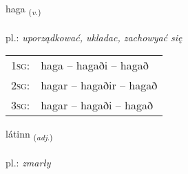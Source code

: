 \documentclass[frontgrid, backgrid]{flacards}\usepackage[]{graphicx}\usepackage[]{xcolor}
\begin{document}
\renewcommand{\flhead}{\vskip5pt \fboxsep=0pt {\small\bfseries\footnotesize Sagnorð | czasownik}}
\renewcommand{\fcfoot}{\vskip5pt \fboxsep=0pt \hspace{2pt}{\small\bfseries\footnotesize 3K}}

\renewcommand{\blhead}{\vskip5pt {\small\bfseries\footnotesize Sagnorð | czasownik }}
\renewcommand{\bcfoot}{\vskip5pt \hspace{2pt}{\small\bfseries\footnotesize 3K}}


{haga \small{\textsubscript{(\textit{v.})}} \\[1ex] %
\textphonetic{[haːɣa]} \\
pl.: \emph{uporządkować, ukladac, zachowyać się} \\  [2ex]
\renewcommand*{\arraystretch}{0.8}
\begin{tabular}{p{1cm}l}
\textsc{1sg}: & haga -- hagaði -- hagað \\ 
\textsc{2sg}: & hagar -- hagaðir -- hagað \\ 
\textsc{3sg}: & hagar -- hagaði -- hagað \\ 
\end{tabular}
}

\renewcommand{\flhead}{\vskip5pt \fboxsep=0pt {\small\bfseries\footnotesize Lýsingarorð | przymiotnik}}
\renewcommand{\fcfoot}{\vskip5pt \fboxsep=0pt \hspace{2pt}{\small\bfseries\footnotesize 3K}}

\renewcommand{\blhead}{\vskip5pt {\small\bfseries\footnotesize Lýsingarorð | przymiotnik }}
\renewcommand{\bcfoot}{\vskip5pt \hspace{2pt}{\small\bfseries\footnotesize 3K}}


{látinn \small{\textsubscript{(\textit{adj.})}} \\[1ex] %
\textphonetic{[lauːtɪn]} \\
pl.: \emph{zmarły} \\  [2ex]
\renewcommand*{\arraystretch}{0.8}
}
\end{document}
